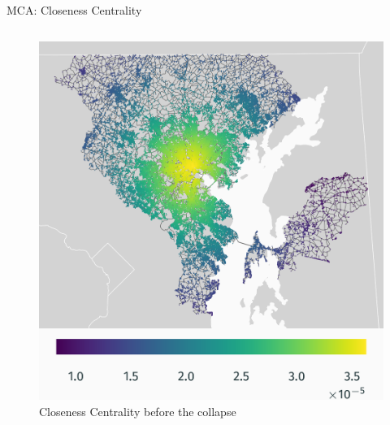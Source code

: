 \documentclass{beamer}
\numberwithin{figure}{section} %
\numberwithin{table}{section} %
\begin{document}
\begin{frame}{MCA: Closeness Centrality}
    \begin{columns}
        \begin{column}{0.33\textwidth}
            \begin{figure}
                \centering
                \includegraphics[width=\textwidth]{maps/closeness_w_bridge.png}
                {\scriptsize Closeness Centrality before the collapse}
            \end{figure}
        \end{column}


\end{columns}
\end{frame}
\end{document}
